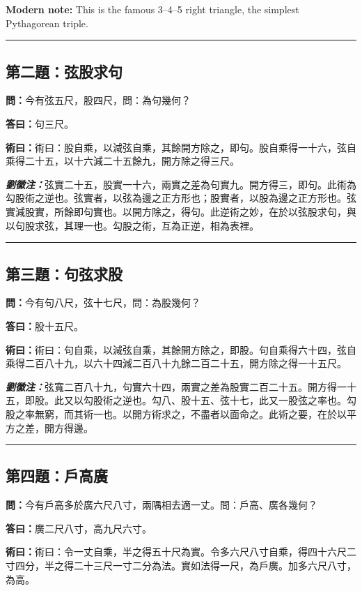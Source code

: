 \documentclass[11pt,a4paper]{article}
\newcommand{\wen}[1]{\textbf{\color{problemcolor}問：}#1\par}
\newcommand{\da}[1]{\textbf{答曰：}#1\par}
\newcommand{\shu}[1]{\textbf{術曰：}#1\par}
\newcommand{\liuhui}[1]{{\color{commentarycolor}\textit{\textbf{劉徽注：}}#1\par}}
\begin{document}
\textbf{Modern note:} This is the famous 3--4--5 right triangle, the simplest Pythagorean triple.

\bigskip
\hrule
\bigskip

\subsection{第二題：弦股求句}

\wen{今有弦五尺，股四尺，問：為句幾何？}

\da{句三尺。}

\shu{術曰：股自乘，以減弦自乘，其餘開方除之，即句。股自乘得一十六，弦自乘得二十五，以十六減二十五餘九，開方除之得三尺。}

\liuhui{弦實二十五，股實一十六，兩實之差為句實九。開方得三，即句。此術為勾股術之逆也。弦實者，以弦為邊之正方形也；股實者，以股為邊之正方形也。弦實減股實，所餘即句實也。以開方除之，得句。此逆術之妙，在於以弦股求句，與以句股求弦，其理一也。勾股之術，互為正逆，相為表裡。}

\bigskip
\hrule
\bigskip

\subsection{第三題：句弦求股}

\wen{今有句八尺，弦十七尺，問：為股幾何？}

\da{股十五尺。}

\shu{術曰：句自乘，以減弦自乘，其餘開方除之，即股。句自乘得六十四，弦自乘得二百八十九，以六十四減二百八十九餘二百二十五，開方除之得一十五尺。}

\liuhui{弦寬二百八十九，句實六十四，兩實之差為股實二百二十五。開方得一十五，即股。此又以勾股術之逆也。勾八、股十五、弦十七，此又一股弦之率也。勾股之率無窮，而其術一也。以開方術求之，不盡者以面命之。此術之要，在於以平方之差，開方得邊。}

\bigskip
\hrule
\bigskip

\subsection{第四題：戶高廣}

\wen{今有戶高多於廣六尺八寸，兩隅相去適一丈。問：戶高、廣各幾何？}

\da{廣二尺八寸，高九尺六寸。}

\shu{術曰：令一丈自乘，半之得五十尺為實。令多六尺八寸自乘，得四十六尺二寸四分，半之得二十三尺一寸二分為法。實如法得一尺，為戶廣。加多六尺八寸，為高。}
\end{document}
